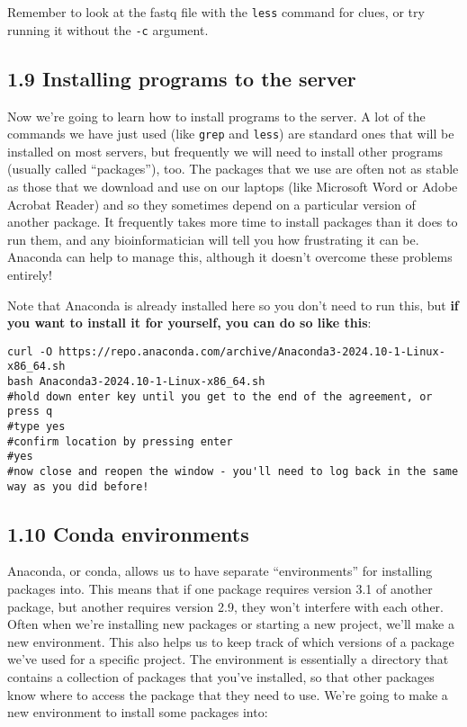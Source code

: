 \documentclass[
]{book}
\begin{document}
Remember to look at the fastq file with the \texttt{less} command for clues, or try running it without the \texttt{-c} argument.

\subsection{1.9 Installing programs to the server}\label{installing-programs-to-the-server}

Now we're going to learn how to install programs to the server. A lot of the commands we have just used (like \texttt{grep} and \texttt{less}) are standard ones that will be installed on most servers, but frequently we will need to install other programs (usually called ``packages''), too. The packages that we use are often not as stable as those that we download and use on our laptops (like Microsoft Word or Adobe Acrobat Reader) and so they sometimes depend on a particular version of another package. It frequently takes more time to install packages than it does to run them, and any bioinformatician will tell you how frustrating it can be. Anaconda can help to manage this, although it doesn't overcome these problems entirely!

Note that Anaconda is already installed here so you don't need to run this, but \textbf{if you want to install it for yourself, you can do so like this}:

\begin{verbatim}
curl -O https://repo.anaconda.com/archive/Anaconda3-2024.10-1-Linux-x86_64.sh
bash Anaconda3-2024.10-1-Linux-x86_64.sh
#hold down enter key until you get to the end of the agreement, or press q
#type yes
#confirm location by pressing enter
#yes
#now close and reopen the window - you'll need to log back in the same way as you did before!
\end{verbatim}

\subsection{1.10 Conda environments}\label{conda-environments}

Anaconda, or conda, allows us to have separate ``environments'' for installing packages into. This means that if one package requires version 3.1 of another package, but another requires version 2.9, they won't interfere with each other. Often when we're installing new packages or starting a new project, we'll make a new environment. This also helps us to keep track of which versions of a package we've used for a specific project. The environment is essentially a directory that contains a collection of packages that you've installed, so that other packages know where to access the package that they need to use. We're going to make a new environment to install some packages into:
\end{document}
